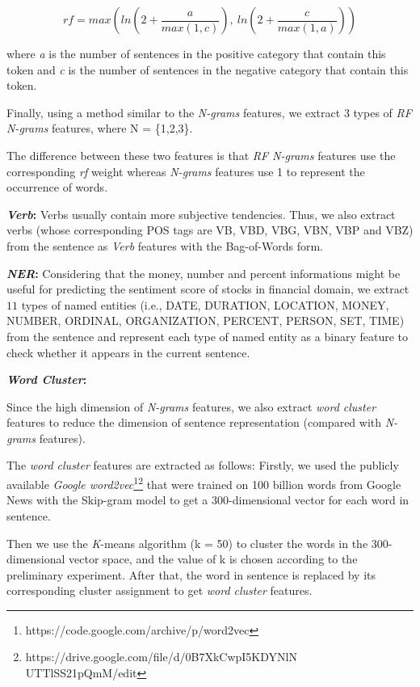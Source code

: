 \documentclass[11pt,a4paper]{article}
\begin{document}
\begin{small}
\begin{displaymath}\label{rf}
  rf = max \left( ln( 2 + \frac{a}{max(1,c)} ), \ ln( 2 + \frac{c}{max(1,a)} ) \right)
\end{displaymath}
\end{small}

where \emph{a} is the number of sentences in the positive category that contain this token and \emph{c} is the number of sentences in the negative category that contain this token.

Finally, using a method similar to the \emph{N-grams} features, we extract 3 types of \emph{RF N-grams} features, where N = \{1,2,3\}.

The difference between these two features is that \emph{RF N-grams} features use the corresponding \emph{rf} weight whereas \emph{N-grams} features use 1 to represent the occurrence of words.



\textbf{\emph{Verb}:}
Verbs usually contain more subjective tendencies. Thus, we also extract verbs (whose corresponding POS tags are VB, VBD, VBG, VBN, VBP and VBZ) from the sentence as \emph{Verb} features with the Bag-of-Words form.


\textbf{\emph{NER}:}
Considering that the money, number and percent informations might be useful for predicting the sentiment score of stocks in financial domain, we extract $11$ types of named entities (i.e., DATE, DURATION, LOCATION, MONEY, NUMBER, ORDINAL, ORGANIZATION, PERCENT, PERSON, SET, TIME) from the sentence and represent each type of  named entity as a binary feature to check whether it appears in the current sentence.




\textbf{\emph{Word Cluster}:}

Since the high dimension of \emph{N-grams} features, we also extract \emph{word cluster} features to reduce the dimension of sentence representation (compared with \emph{N-grams} features).

The \emph{word cluster} features are extracted as follows: Firstly, we used the publicly available \emph{Google word2vec}\footnote{https://code.google.com/archive/p/word2vec}\footnote{https://drive.google.com/file/d/0B7XkCwpI5KDYNlN
UTTlSS21pQmM/edit} that were trained on 100 billion words from Google News with the Skip-gram model \cite{mikolov2013distributed} to get a $300$-dimensional vector for each word in sentence.

Then we use the \emph{K}-means algorithm (k = 50) to cluster the words in the 300-dimensional vector space, and the value of k is chosen according to the preliminary experiment. After that, the word in sentence is replaced by its corresponding cluster assignment to get \emph{word cluster} features.
\end{document}
